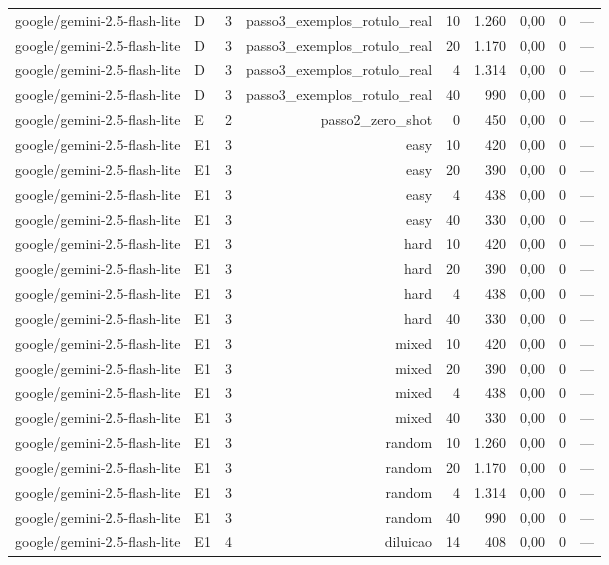 \begin{table}[htbp]
\begin{tabular}{lllrrrrrr}
google/gemini-2.5-flash-lite & D & 3 & passo3\_exemplos\_rotulo\_real & 10 & 1.260 & 0,00 & 0 & — \\
google/gemini-2.5-flash-lite & D & 3 & passo3\_exemplos\_rotulo\_real & 20 & 1.170 & 0,00 & 0 & — \\
google/gemini-2.5-flash-lite & D & 3 & passo3\_exemplos\_rotulo\_real & 4 & 1.314 & 0,00 & 0 & — \\
google/gemini-2.5-flash-lite & D & 3 & passo3\_exemplos\_rotulo\_real & 40 & 990 & 0,00 & 0 & — \\
google/gemini-2.5-flash-lite & E & 2 & passo2\_zero\_shot & 0 & 450 & 0,00 & 0 & — \\
google/gemini-2.5-flash-lite & E1 & 3 & easy & 10 & 420 & 0,00 & 0 & — \\
google/gemini-2.5-flash-lite & E1 & 3 & easy & 20 & 390 & 0,00 & 0 & — \\
google/gemini-2.5-flash-lite & E1 & 3 & easy & 4 & 438 & 0,00 & 0 & — \\
google/gemini-2.5-flash-lite & E1 & 3 & easy & 40 & 330 & 0,00 & 0 & — \\
google/gemini-2.5-flash-lite & E1 & 3 & hard & 10 & 420 & 0,00 & 0 & — \\
google/gemini-2.5-flash-lite & E1 & 3 & hard & 20 & 390 & 0,00 & 0 & — \\
google/gemini-2.5-flash-lite & E1 & 3 & hard & 4 & 438 & 0,00 & 0 & — \\
google/gemini-2.5-flash-lite & E1 & 3 & hard & 40 & 330 & 0,00 & 0 & — \\
google/gemini-2.5-flash-lite & E1 & 3 & mixed & 10 & 420 & 0,00 & 0 & — \\
google/gemini-2.5-flash-lite & E1 & 3 & mixed & 20 & 390 & 0,00 & 0 & — \\
google/gemini-2.5-flash-lite & E1 & 3 & mixed & 4 & 438 & 0,00 & 0 & — \\
google/gemini-2.5-flash-lite & E1 & 3 & mixed & 40 & 330 & 0,00 & 0 & — \\
google/gemini-2.5-flash-lite & E1 & 3 & random & 10 & 1.260 & 0,00 & 0 & — \\
google/gemini-2.5-flash-lite & E1 & 3 & random & 20 & 1.170 & 0,00 & 0 & — \\
google/gemini-2.5-flash-lite & E1 & 3 & random & 4 & 1.314 & 0,00 & 0 & — \\
google/gemini-2.5-flash-lite & E1 & 3 & random & 40 & 990 & 0,00 & 0 & — \\
google/gemini-2.5-flash-lite & E1 & 4 & diluicao & 14 & 408 & 0,00 & 0 & — \\

\end{tabular}
\end{table}
